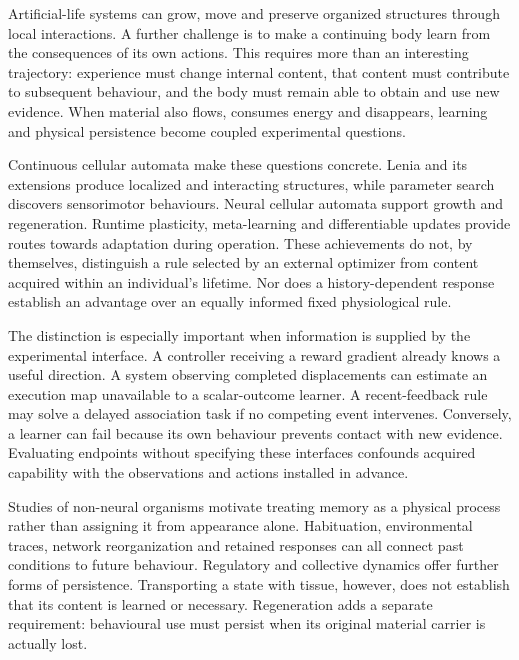Artificial-life systems can grow, move and preserve organized structures through local interactions. A further challenge is to make a continuing body learn from the consequences of its own actions. This requires more than an interesting trajectory: experience must change internal content, that content must contribute to subsequent behaviour, and the body must remain able to obtain and use new evidence. When material also flows, consumes energy and disappears, learning and physical persistence become coupled experimental questions.

Continuous cellular automata make these questions concrete. Lenia and its extensions produce localized and interacting structures, while parameter search discovers sensorimotor behaviours\cite{chan,expandedlenia,plantec,hamon,asal}. Neural cellular automata support growth and regeneration\cite{growingca,developmental,bricks}. Runtime plasticity, meta-learning and differentiable updates provide routes towards adaptation during operation\cite{khajehabdollahi,pdnca,duan,wang,miconi,backpropamine}. These achievements do not, by themselves, distinguish a rule selected by an external optimizer from content acquired within an individual's lifetime. Nor does a history-dependent response establish an advantage over an equally informed fixed physiological rule.

The distinction is especially important when information is supplied by the experimental interface. A controller receiving a reward gradient already knows a useful direction. A system observing completed displacements can estimate an execution map unavailable to a scalar-outcome learner. A recent-feedback rule may solve a delayed association task if no competing event intervenes. Conversely, a learner can fail because its own behaviour prevents contact with new evidence. Evaluating endpoints without specifying these interfaces confounds acquired capability with the observations and actions installed in advance.

Studies of non-neural organisms motivate treating memory as a physical process rather than assigning it from appearance alone. Habituation, environmental traces, network reorganization and retained responses can all connect past conditions to future behaviour\cite{boisseau,reid,kramar2021,vogel,boussard,reiber}. Regulatory and collective dynamics offer further forms of persistence\cite{acar,micheelsen,yang,lambert}. Transporting a state with tissue, however, does not establish that its content is learned or necessary. Regeneration adds a separate requirement: behavioural use must persist when its original material carrier is actually lost\cite{shomrat}.

